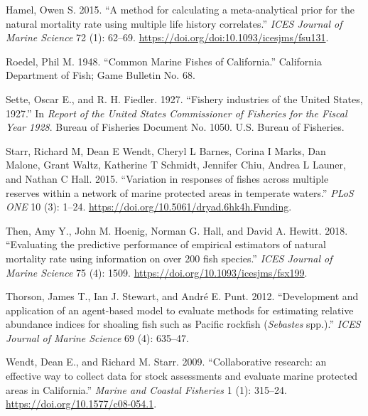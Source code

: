\documentclass[11pt,
  english,
  a4paper,
]{article}
\newlength{\cslhangindent}
\newenvironment{CSLReferences}[2] %
 {%
  \setlength{\parindent}{0pt}
  \ifodd #1 \everypar{\setlength{\hangindent}{\cslhangindent}}\ignorespaces\fi
  \ifnum #2 > 0
  \setlength{\parskip}{#2\baselineskip}
  \fi
 }%
 {}
\begin{document}
\hypertarget{refs}{}
\begin{CSLReferences}{1}{0}
\leavevmode{}%
Hamel, Owen S. 2015. {``{A method for calculating a meta-analytical prior for the natural mortality rate using multiple life history correlates}.''} \emph{ICES Journal of Marine Science} 72 (1): 62--69. \url{https://doi.org/doi:10.1093/icesjms/fsu131}.

\leavevmode{}%
Roedel, Phil M. 1948. {``{Common Marine Fishes of California}.''} California Department of Fish; Game Bulletin No. 68.

\leavevmode{}%
Sette, Oscar E., and R. H. Fiedler. 1927. {``{Fishery industries of the United States, 1927}.''} In \emph{Report of the United States Commissioner of Fisheries for the Fiscal Year 1928}. Bureau of Fisheries Document No. 1050. U.S. Bureau of Fisheries.

\leavevmode{}%
Starr, Richard M, Dean E Wendt, Cheryl L Barnes, Corina I Marks, Dan Malone, Grant Waltz, Katherine T Schmidt, Jennifer Chiu, Andrea L Launer, and Nathan C Hall. 2015. {``{Variation in responses of fishes across multiple reserves within a network of marine protected areas in temperate waters}.''} \emph{PLoS ONE} 10 (3): 1--24. \url{https://doi.org/10.5061/dryad.6hk4h.Funding}.

\leavevmode{}%
Then, Amy Y., John M. Hoenig, Norman G. Hall, and David A. Hewitt. 2018. {``{Evaluating the predictive performance of empirical estimators of natural mortality rate using information on over 200 fish species}.''} \emph{ICES Journal of Marine Science} 75 (4): 1509. \url{https://doi.org/10.1093/icesjms/fsx199}.

\leavevmode{}%
Thorson, James T., Ian J. Stewart, and André E. Punt. 2012. {``{Development and application of an agent-based model to evaluate methods for estimating relative abundance indices for shoaling fish such as Pacific rockfish (\emph{Sebastes} spp.)}.''} \emph{ICES Journal of Marine Science} 69 (4): 635--47.

\leavevmode{}%
Wendt, Dean E., and Richard M. Starr. 2009. {``{Collaborative research: an effective way to collect data for stock assessments and evaluate marine protected areas in California}.''} \emph{Marine and Coastal Fisheries} 1 (1): 315--24. \url{https://doi.org/10.1577/c08-054.1}.

\end{CSLReferences}
\end{document}

